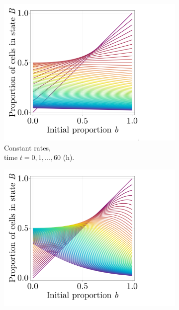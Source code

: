 \begin{figure}[ht]
    \centering
    \begin{subfigure}{0.47\textwidth}
        \centering
        \includegraphics[width=\textwidth]{figures/407/407-phib-vs-b-solution-constant-all.png}
        \caption{Constant rates,\\time $t=0,1,...,60$ (h).}
        \label{fig:phib-solutions-1}
    \end{subfigure}
    \hfill
    \begin{subfigure}{0.47\textwidth}
        \centering
        \includegraphics[width=\textwidth]{figures/407/407-phib-vs-b-solution-meanfield-all.png}

\end{subfigure}
\end{figure}
